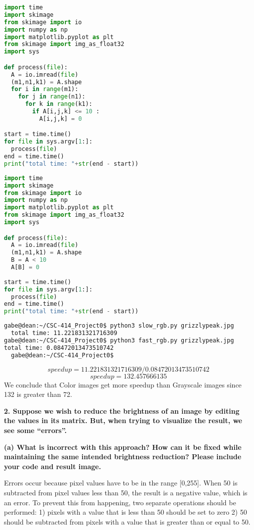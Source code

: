 \documentclass[12pt]{article}
\begin{document}
\begin{lstlisting}[frame=single,language=Python,caption=Slower For Loops with Color Image\label{code:color_slow}]
import time
import skimage
from skimage import io
import numpy as np
import matplotlib.pyplot as plt
from skimage import img_as_float32
import sys

def process(file):
  A = io.imread(file)
  (m1,n1,k1) = A.shape
  for i in range(m1):
    for j in range(n1):
      for k in range(k1):
        if A[i,j,k] <= 10 :
          A[i,j,k] = 0

start = time.time()
for file in sys.argv[1:]:
  process(file)
end = time.time()
print("total time: "+str(end - start))
\end{lstlisting}
\newpage
\begin{lstlisting}[frame=single,language=Python,caption=Logical Indexing with Color Image\label{code:color_fast}]
import time
import skimage
from skimage import io
import numpy as np
import matplotlib.pyplot as plt
from skimage import img_as_float32
import sys

def process(file):
  A = io.imread(file)
  (m1,n1,k1) = A.shape
  B = A < 10
  A[B] = 0
  
start = time.time()
for file in sys.argv[1:]:
  process(file)
end = time.time()
print("total time: "+str(end - start))
\end{lstlisting}

\begin{lstlisting}[frame=single,language=Bash,caption=Command Line Performance Testing\label{code:performance_grayscale}]
gabe@dean:~/CSC-414_Project0$ python3 slow_rgb.py grizzlypeak.jpg 
  total time: 11.221831321716309
gabe@dean:~/CSC-414_Project0$ python3 fast_rgb.py grizzlypeak.jpg 
total time: 0.08472013473510742
  gabe@dean:~/CSC-414_Project0$ 
\end{lstlisting}
\[
  speedup = 11.221831321716309 / 0.08472013473510742
\]
\[
  speedup = 132.457666135
\]
We conclude that Color images get more speedup than Grayscale images since 132 is greater than 72.

\newpage
\textbf{2. Suppose we wish to reduce the brightness of an image by editing the values in its
matrix. But, when trying to visualize the result, we see some “errors”.}

\textbf{(a) What is incorrect with this approach? How can it be fixed while maintaining
the same intended brightness reduction? Please include your code and result
image.}

Errors occur because pixel values have to be in the range [0,255]. When 50
is subtracted from pixel values less than 50, the result is a negative value, 
which is an error. To prevent this from happening, two separate operations should
be performed: 
  1) pixels with a value that is less than 50 should be set to zero
  2) 50 should be subtracted from pixels with a value that is greater than or equal to 50.
\end{document}
